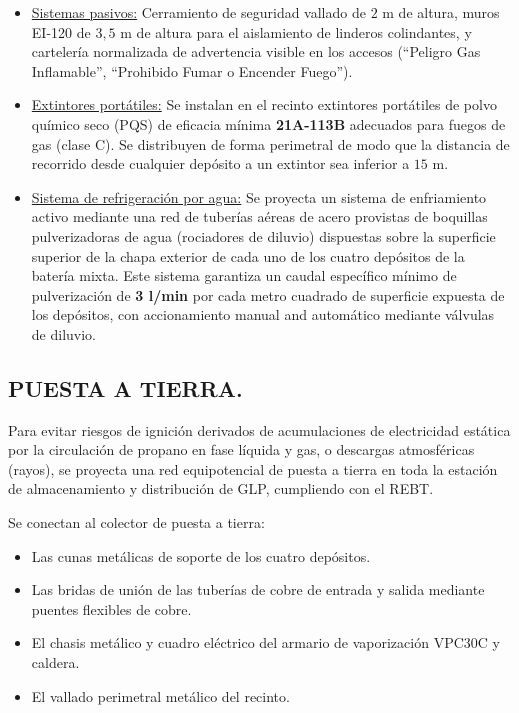 \documentclass[12pt]{article}
\begin{document}
        \begin{itemize}
            \item \underline{Sistemas pasivos:} Cerramiento de seguridad vallado de $2\text{ m}$ de altura, muros EI-120 de $3,5\text{ m}$ de altura para el aislamiento de linderos colindantes, y cartelería normalizada de advertencia visible en los accesos (``Peligro Gas Inflamable'', ``Prohibido Fumar o Encender Fuego'').
            \item \underline{Extintores portátiles:} Se instalan en el recinto extintores portátiles de polvo químico seco (PQS) de eficacia mínima \textbf{21A-113B} adecuados para fuegos de gas (clase C). Se distribuyen de forma perimetral de modo que la distancia de recorrido desde cualquier depósito a un extintor sea inferior a $15\text{ m}$.
            \item \underline{Sistema de refrigeración por agua:} Se proyecta un sistema de enfriamiento activo mediante una red de tuberías aéreas de acero provistas de boquillas pulverizadoras de agua (rociadores de diluvio) dispuestas sobre la superficie superior de la chapa exterior de cada uno de los cuatro depósitos de la batería mixta. Este sistema garantiza un caudal específico mínimo de pulverización de \textbf{3 l/min} por cada metro cuadrado de superficie expuesta de los depósitos, con accionamiento manual and automático mediante válvulas de diluvio.
        \end{itemize}
        
        \subsection{PUESTA A TIERRA.}
        Para evitar riesgos de ignición derivados de acumulaciones de electricidad estática por la circulación de propano en fase líquida y gas, o descargas atmosféricas (rayos), se proyecta una red equipotencial de puesta a tierra en toda la estación de almacenamiento y distribución de GLP, cumpliendo con el REBT.
        
        Se conectan al colector de puesta a tierra:
        \begin{itemize}
            \item Las cunas metálicas de soporte de los cuatro depósitos.
            \item Las bridas de unión de las tuberías de cobre de entrada y salida mediante puentes flexibles de cobre.
            \item El chasis metálico y cuadro eléctrico del armario de vaporización VPC30C y caldera.
            \item El vallado perimetral metálico del recinto.
        \end{itemize}
        
\end{document}

